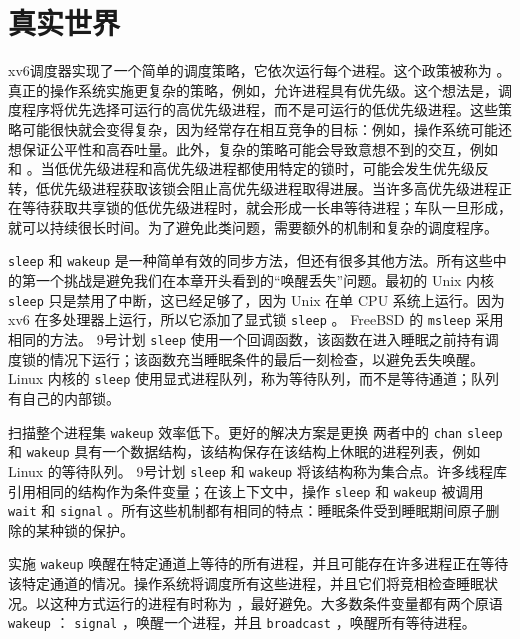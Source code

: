 \documentclass[UTF8]{article}
\begin{document}
{    \section{真实世界  }     

xv6调度器实现了一个简单的调度策略，它依次运行每个进程。这个政策被称为
        。真正的操作系统实施更复杂的策略，例如，允许进程具有优先级。这个想法是，调度程序将优先选择可运行的高优先级进程，而不是可运行的低优先级进程。这些策略可能很快就会变得复杂，因为经常存在相互竞争的目标：例如，操作系统可能还想保证公平性和高吞吐量。此外，复杂的策略可能会导致意想不到的交互，例如
        和
        。当低优先级进程和高优先级进程都使用特定的锁时，可能会发生优先级反转，低优先级进程获取该锁会阻止高优先级进程取得进展。当许多高优先级进程正在等待获取共享锁的低优先级进程时，就会形成一长串等待进程；车队一旦形成，就可以持续很长时间。为了避免此类问题，需要额外的机制和复杂的调度程序。  

   \lstinline{sleep}    和
    \lstinline{wakeup}   是一种简单有效的同步方法，但还有很多其他方法。所有这些中的第一个挑战是避免我们在本章开头看到的“唤醒丢失”问题。最初的 Unix 内核
    \lstinline{sleep}    只是禁用了中断，这已经足够了，因为 Unix 在单 CPU 系统上运行。因为 xv6 在多处理器上运行，所以它添加了显式锁
    \lstinline{sleep}    。 FreeBSD 的
    \lstinline{msleep}    采用相同的方法。 9号计划
    \lstinline{sleep}    使用一个回调函数，该函数在进入睡眠之前持有调度锁的情况下运行；该函数充当睡眠条件的最后一刻检查，以避免丢失唤醒。 Linux 内核的
    \lstinline{sleep}    使用显式进程队列，称为等待队列，而不是等待通道；队列有自己的内部锁。  

扫描整个进程集
    \lstinline{wakeup}    效率低下。更好的解决方案是更换
 两者中的    \lstinline{chan}   
    \lstinline{sleep}    和
    \lstinline{wakeup}    具有一个数据结构，该结构保存在该结构上休眠的进程列表，例如 Linux 的等待队列。 9号计划
    \lstinline{sleep}    和
    \lstinline{wakeup}    将该结构称为集合点。许多线程库引用相同的结构作为条件变量；在该上下文中，操作
    \lstinline{sleep}    和
    \lstinline{wakeup}    被调用
    \lstinline{wait}    和
    \lstinline{signal}    。所有这些机制都有相同的特点：睡眠条件受到睡眠期间原子删除的某种锁的保护。  

实施
    \lstinline{wakeup}    唤醒在特定通道上等待的所有进程，并且可能存在许多进程正在等待该特定通道的情况。操作系统将调度所有这些进程，并且它们将竞相检查睡眠状况。以这种方式运行的进程有时称为
        ，最好避免。大多数条件变量都有两个原语
    \lstinline{wakeup}   ：
    \lstinline{signal}    ，唤醒一个进程，并且
    \lstinline{broadcast}    ，唤醒所有等待进程。  

}
\end{document}
